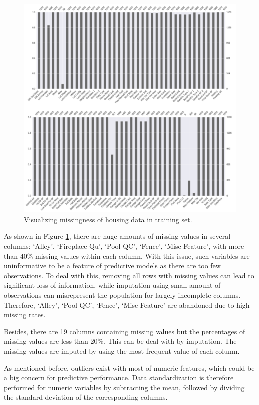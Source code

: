 \documentclass[letterpaper,12pt,twoside,]{pinp}
\begin{document}
\begin{figure}
\includegraphics[width=1\linewidth]{miss_plot.png}
\centering
\caption{Visualizing missingness of housing data in training set.}
\label{fig:miss}
\end{figure}

As shown in Figure \ref{fig:miss}, there are huge amounts of missing
values in several columns: `Alley', `Fireplace Qu', `Pool QC', `Fence',
`Misc Feature', with more than 40\% missing values within each column.
With this issue, such variables are uninformative to be a feature of
predictive models as there are too few observations. To deal with this,
removing all rows with missing values can lead to significant loss of
information, while imputation using small amount of observations can
misrepresent the population for largely incomplete columns. Therefore,
`Alley', `Pool QC', `Fence', `Misc Feature' are abandoned due to high
missing rates.

Besides, there are 19 columns containing missing values but the
percentages of missing values are less than 20\%. This can be deal with
by imputation. The missing values are imputed by using the most frequent
value of each column.

As mentioned before, outliers exist with most of numeric features, which
could be a big concern for predictive performance. Data standardization
is therefore performed for numeric variables by subtracting the mean,
followed by dividing the standard deviation of the corresponding
columns.
\end{document}
